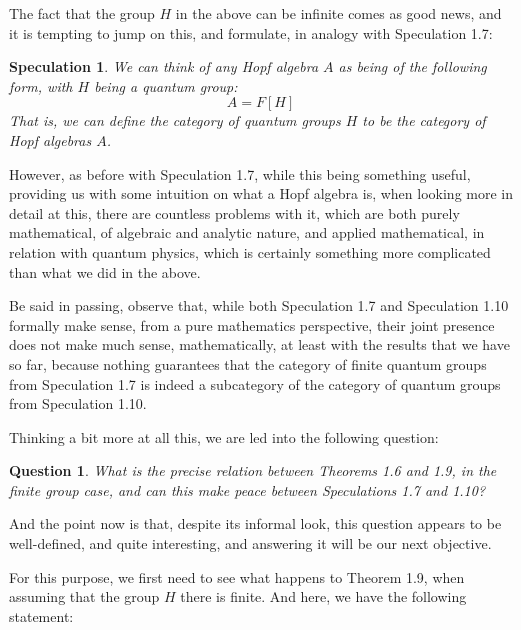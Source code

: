 \documentclass[12pt]{amsbook}
\newtheorem{question}[theorem]{Question}
\newtheorem{speculation}[theorem]{Speculation}
\begin{document}
The fact that the group $H$ in the above can be infinite comes as good news, and it is tempting to jump on this, and formulate, in analogy with Speculation 1.7:

\begin{speculation}
We can think of any Hopf algebra $A$ as being of the following form, with $H$ being a quantum group: 
$$A=F[H]$$
That is, we can define the category of quantum groups $H$ to be the category of Hopf algebras $A$.
\end{speculation}

However, as before with Speculation 1.7, while this being something useful, providing us with some intuition on what a Hopf algebra is, when looking more in detail at this, there are countless problems with it, which are both purely mathematical, of algebraic and analytic nature, and applied mathematical, in relation with quantum physics, which is certainly something more complicated than what we did in the above. 

\bigskip

Be said in passing, observe that, while both Speculation 1.7 and Speculation 1.10 formally make sense, from a pure mathematics perspective, their joint presence does not make much sense, mathematically, at least with the results that we have so far, because nothing guarantees that the category of finite quantum groups from Speculation 1.7 is indeed a subcategory of the category of quantum groups from Speculation 1.10.

\bigskip

Thinking a bit more at all this, we are led into the following question:

\begin{question}
What is the precise relation between Theorems 1.6 and 1.9, in the finite group case, and can this make peace between Speculations 1.7 and 1.10?
\end{question}

And the point now is that, despite its informal look, this question appears to be well-defined, and quite interesting, and answering it will be our next objective.

\bigskip

For this purpose, we first need to see what happens to Theorem 1.9, when assuming that the group $H$ there is finite. And here, we have the following statement:

\end{document}
